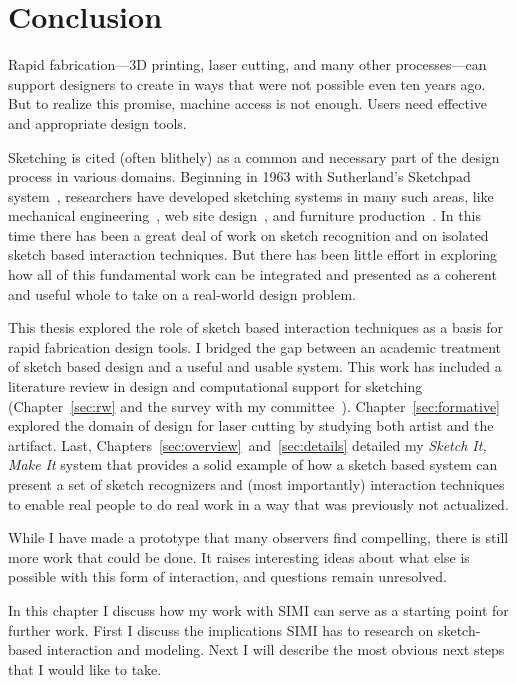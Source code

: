 \chapter{Conclusion}

Rapid fabrication---3D printing, laser cutting, and many other
processes---can support designers to create in ways that were not
possible even ten years ago. But to realize this promise, machine
access is not enough. Users need effective and appropriate design
tools.

Sketching is cited (often blithely) as a common and necessary part of
the design process in various domains. Beginning in 1963 with
Sutherland's Sketchpad system~\cite{sutherland-sketchpad}, researchers
have developed sketching systems in many such areas, like mechanical
engineering~\cite{lipson-correlation}, web site
design~\cite{lin-denim}, and furniture
production~\cite{oh-fab,saul-sketch-chair}. In this time there has
been a great deal of work on sketch recognition and on isolated sketch
based interaction techniques. But there has been little effort in
exploring how all of this fundamental work can be integrated and
presented as a coherent and useful whole to take on a real-world
design problem.

This thesis explored the role of sketch based interaction techniques
as a basis for rapid fabrication design tools. I bridged the gap
between an academic treatment of sketch based design and a useful and
usable system. This work has included a literature review in design
and computational support for sketching (Chapter~\ref{sec:rw} and the
survey with my
committee~\cite{johnson-sketch-review}). Chapter~\ref{sec:formative}
explored the domain of design for laser cutting by studying both
artist and the artifact. Last,
Chapters~\ref{sec:overview}~and~\ref{sec:details} detailed my
\textit{Sketch It, Make It} system that provides a solid example of
how a sketch based system can present a set of sketch recognizers and
(most importantly) interaction techniques to enable real people to do
real work in a way that was previously not actualized.

While I have made a prototype that many observers find compelling,
there is still more work that could be done. It raises interesting
ideas about what else is possible with this form of interaction,
and questions remain unresolved.

In this chapter I discuss how my work with SIMI can serve as a
starting point for further work. First I discuss the implications SIMI
has to research on sketch-based interaction and modeling. Next I will
describe the most obvious next steps that I would like to take.

